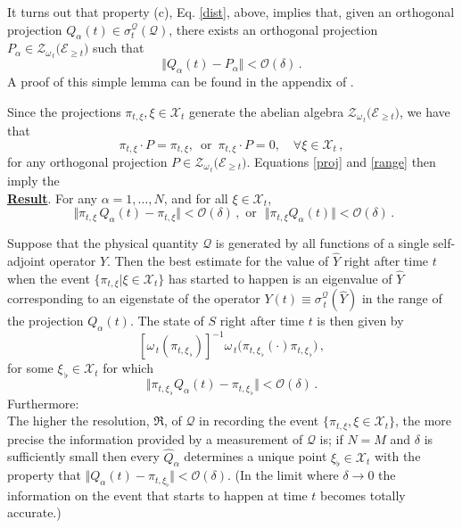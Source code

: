 \documentclass[a4paper,11pt]{article}
\begin{document}
\begin{enumerate}
{It turns out that property (c), Eq. \eqref{dist}, above, implies that, given an orthogonal projection
 $Q_{\alpha}(t) \in \sigma_{t}^{\mathcal{Q}}(\mathcal{Q})$, there exists an orthogonal projection 
 \mbox{$P_{\alpha} \in \mathcal{Z}_{\omega_{\,t}}\big( \mathcal{E}_{\geq t} \big)$} such that
 \begin{equation} \label{proj}
 \Vert Q_{\alpha}(t) - P_{\alpha} \Vert < \mathcal{O}(\delta)\,.
 \end{equation}
 A proof of this simple lemma can be found in the appendix of \cite{FS-Vienna}.
 
 Since the projections $\pi_{t,\xi}, \xi \in \mathcal{X}_t$ generate the abelian algebra $\mathcal{Z}_{\omega_{\,t}}\big(\mathcal{E}_{\geq t}\big)$, we have that 
 \begin{equation}\label{range}
 \pi_{t, \xi}\cdot P = \pi_{t, \xi} , \, \text{ or }\, \pi_{t,\xi}\cdot P =0, \quad \forall \xi \in \mathcal{X}_t\,, 
 \end{equation}
 for any orthogonal projection $P\in \mathcal{Z}_{\omega_{\,t}}\big(\mathcal{E}_{\geq t}\big)$.
Equations \eqref{proj} and \eqref{range} then imply the \vspace{0.2cm}\\
\underline{\bf{Result}}.
For any $\alpha =1,\dots, N$, and for all $\xi \in \mathcal{X}_{t}$, 
$$\boxed{ \,\,\Vert \pi_{t, \xi} \, Q_{\alpha}(t) - \pi_{t, \xi} \Vert < \mathcal{O}(\delta)\,, \,\, \text{or  }\,\, \Vert \pi_{t, \xi} Q_{\alpha}(t) \Vert < \mathcal{O}(\delta)\,.}$$

Suppose that the physical quantity $\mathcal{Q}$ is generated by all functions of a single self-adjoint operator $\hat{Y}$. Then the best estimate for the value of $\hat{Y}$ right after time $t$ when the event 
$\lbrace \pi_{t,\xi} \vert \xi \in \mathcal{X}_{t} \rbrace$ has started to happen is an eigenvalue of $\hat{Y}$ corresponding to an eigenstate of the operator $Y(t)\equiv \sigma_{\,t}^{\mathcal{Q}}(\hat{Y})$ in the range of the projection $Q_{\alpha}(t)$. The state of $S$ right after time $t$ is then given by 
$$[\omega_{\,t}(\pi_{t, \xi_{\,\flat}})]^{-1} \omega_{\,t}\big( \pi_{t,\xi_{\,\flat}} (\cdot) \pi_{t,\xi_{\,\flat}}\big)\,,$$
for some $\xi_{\,\flat} \in \mathcal{X}_{t}$ for which 
\begin{equation} \label{recording}
\Vert \pi_{t,\xi_{\,\flat}} Q_{\alpha}(t) - \pi_{t, \xi_{\,\flat}} \Vert < \mathcal{O}(\delta)\,.
\end{equation}
Furthermore:\\
The higher the resolution, $\mathfrak{R}$, of $\mathcal{Q}$ in recording the event
$\lbrace \pi_{t,\xi}, \xi \in \mathcal{X}_{t}\rbrace$, the more precise the information provided by a measurement of $\mathcal{Q}$ is; if $N=M$ and 
$\delta$ is sufficiently small then every $\widehat{Q}_{\alpha}$ determines a unique point $\xi_{\flat} \in \mathcal{X}_t$ with the property that $\Vert Q_{\alpha}(t) - \pi_{t, \xi_{\flat}} \Vert < \mathcal{O}(\delta)$. (In the limit where $\delta \rightarrow 0$ the information on the event that starts to happen at time $t$ becomes totally accurate.)

}
\end{enumerate}
\end{document}
